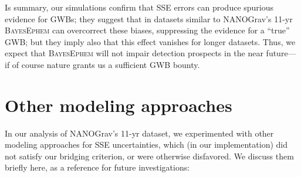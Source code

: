\documentclass[iop,apj,twocolappendix]{emulateapj}
\begin{document}
Is summary, our simulations confirm that SSE errors can produce spurious evidence for GWBs; they suggest that in datasets similar to NANOGrav's 11-yr \textsc{BayesEphem} can overcorrect these biases, suppressing the evidence for a ``true'' GWB; but they imply also that this effect vanishes for longer datasets. Thus, we expect that \textsc{BayesEphem} will not impair detection prospects in the near future---if of course nature grants us a sufficient GWB bounty.

\section{Other modeling approaches}
\label{sec:othermodels}

In our analysis of NANOGrav's 11-yr dataset, we experimented with other modeling approaches for SSE uncertainties, which (in our implementation) did not satisfy our bridging criterion, or were otherwise disfavored. We discuss them briefly here, as a reference for future investigations:
%
\end{document}
